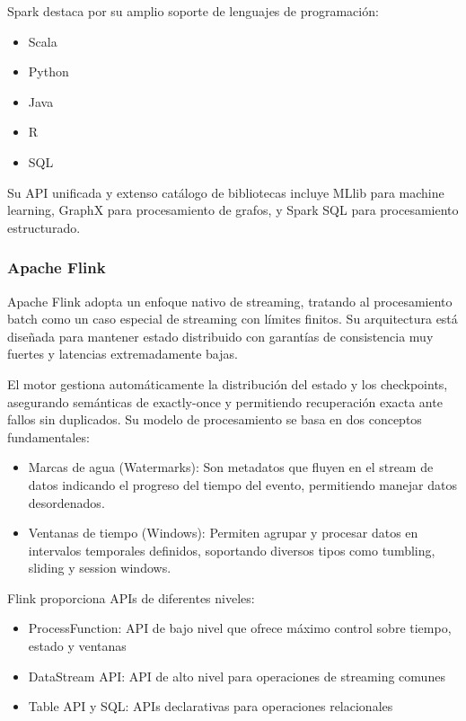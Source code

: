 Spark destaca por su amplio soporte de lenguajes de programación:

\begin{itemize}
    \item Scala
    \item Python
    \item Java 
    \item R
    \item SQL
\end{itemize}

Su API unificada y extenso catálogo de bibliotecas incluye MLlib para machine learning, GraphX para procesamiento de
grafos, y Spark SQL para procesamiento estructurado.

\newpage
\subsubsection{Apache Flink}

Apache Flink adopta un enfoque nativo de streaming, tratando al procesamiento batch como un caso especial de streaming
con límites finitos. Su arquitectura está diseñada para mantener estado distribuido con garantías de consistencia muy
fuertes y latencias extremadamente bajas.\newline

El motor gestiona automáticamente la distribución del estado y los checkpoints,
asegurando semánticas de exactly-once y permitiendo recuperación exacta ante fallos sin duplicados.
Su modelo de procesamiento se basa en dos conceptos fundamentales:

\begin{itemize}
    \item Marcas de agua (Watermarks): Son metadatos que fluyen en el stream de datos indicando el progreso del tiempo del evento,
    permitiendo manejar datos desordenados.
    \item Ventanas de tiempo (Windows): Permiten agrupar y procesar datos en intervalos temporales definidos, soportando diversos
    tipos como tumbling, sliding y session windows. 
\end{itemize}

Flink proporciona APIs de diferentes niveles:

\begin{itemize}
    \item ProcessFunction: API de bajo nivel que ofrece máximo control sobre tiempo, estado y ventanas
    \item DataStream API: API de alto nivel para operaciones de streaming comunes
    \item Table API y SQL: APIs declarativas para operaciones relacionales   
\end{itemize}

